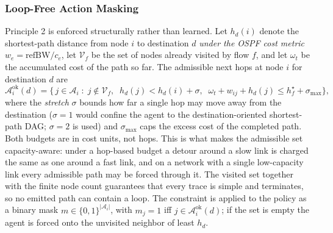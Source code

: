 \subsubsection{Loop-Free Action Masking}\label{sec:mask}
Principle 2 is enforced structurally rather than learned. Let $h_d(i)$ denote
the shortest-path distance from node $i$ to destination $d$ \emph{under the OSPF
cost metric} $w_e=\mathrm{refBW}/c_e$, let $\mathcal{V}_f$ be the set of nodes
already visited by flow $f$, and let $\omega_t$ be the accumulated cost of the
path so far. The admissible next hops at node $i$ for
destination $d$ are
\begin{equation}\label{eq:mask}
\mathcal{A}^{\mathrm{ok}}_i(d)=\bigl\{\,j\in\mathcal{A}_i \;:\;
j\notin\mathcal{V}_f,\;\; h_d(j)<h_d(i)+\sigma,\;\;
\omega_t+w_{ij}+h_d(j)\le h^{\star}_f+\sigma_{\max}\bigr\},
\end{equation}
where the \emph{stretch} $\sigma$ bounds how far a single hop may move away from
the destination ($\sigma=1$ would confine the agent to the destination-oriented
shortest-path DAG; $\sigma=2$ is used) and $\sigma_{\max}$ caps the excess cost of
the completed path. Both budgets are in cost units, not hops. This is what makes
the admissible set capacity-aware: under a hop-based budget a detour around a slow
link is charged the same as one around a fast link, and on a network with a single
low-capacity link every admissible path may be forced through it. The visited set together with the finite node count guarantees that every
trace is simple and terminates, so no emitted path can contain a loop. The
constraint is applied to the policy as a binary mask
$m\in\{0,1\}^{|\mathcal{A}_i|}$, with $m_j=1$ iff
$j\in\mathcal{A}^{\mathrm{ok}}_i(d)$; if the set is empty the agent is forced
onto the unvisited neighbor of least $h_d$.


